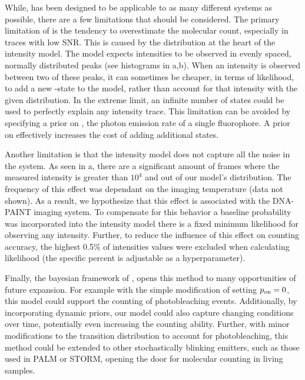 While, \ours has been designed to be applicable to as many different systems as possible, 
there are a few limitations that should be considered.
    The primary limitation of \ours is the tendency to overestimate the molecular count, 
    especially in traces with low SNR. 
    This is caused by the distribution at the heart of the intensity model. 
    The model expects intensities to be observed in evenly spaced, normally distributed 
    peaks (see histograms in a,b).
    When an intensity is observed between two of these peaks, it can sometimes be cheaper, 
    in terms of likelihood, to add a new \z{}-state to the model,
    rather than account for that intensity with the given distribution.
    In the extreme limit, an infinite number of states could be used to perfectly explain any intensity trace.
    This limitation can be avoided by specifying a prior on \re, the photon emission rate of a single fluorophore. 
    A prior on \re effectively increases the cost of adding additional states.

Another limitation is that the intensity model does not capture all the noise in the system.
    As seen in a, there are a significant amount of frames where the 
    measured intensity is greater than $10^4$ and out of our model's distribution.
    The frequency of this effect was dependant on the imaging temperature (data not shown).
    As a result, we hypothesize that this effect is associated with the DNA-PAINT imaging system.
    To compensate for this behavior a baseline probability was incorporated into the intensity model 
    \ie there is a fixed minimum likelihood for observing any intensity.
    Further, to reduce the influence of this effect on counting accuracy, the highest 0.5\% of 
    intensities values were excluded when calculating likelihood (the specific percent is adjustable as a hyperparameter).

Finally, the bayesian framework of \ours, opens this method to many opportunities of future expansion.
    For example with the simple modification of setting $p_\text{on}=0$, this 
    model could support the counting of photobleaching events. 
    Additionally, by incorporating dynamic priors, our model could 
    also capture changing conditions over time, potentially even increasing the counting ability.
    Further, with minor modifications to the transition distribution to account for photobleaching,
    this method could be extended to other stochastically blinking emitters, 
    such as those used in PALM or STORM, opening the door for molecular counting in living samples.
